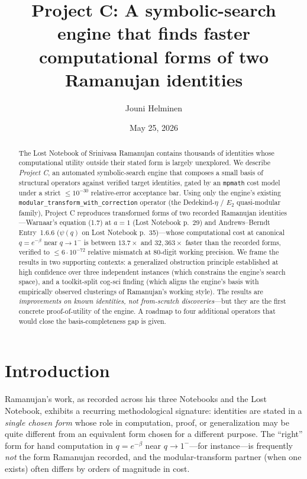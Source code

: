 \documentclass[11pt,reqno]{amsart}
\title{Project C: A symbolic-search engine that finds faster
computational forms of two Ramanujan identities}
\author{Jouni Helminen}
\date{May 25, 2026}
\theoremstyle{definition}
\begin{document}
\begin{abstract}
The Lost Notebook of Srinivasa Ramanujan contains thousands of
identities whose computational utility outside their stated form is
largely unexplored. We describe \emph{Project C}, an automated
symbolic-search engine that composes a small basis of structural
operators against verified target identities, gated by an
\texttt{mpmath} cost model under a strict $\le 10^{-30}$
relative-error acceptance bar. Using only the engine's existing
\verb|modular_transform_with_correction| operator (the Dedekind-$\eta$
/ $E_2$ quasi-modular family), Project C reproduces transformed forms
of two recorded Ramanujan identities---Warnaar's equation (1.7) at
$a=1$ (Lost Notebook p.~29) and Andrews--Berndt Entry~1.6.6 ($\psi(q)$
on Lost Notebook p.~35)---whose computational cost at canonical
$q = e^{-\beta}$ near $q \to 1^-$ is between $13.7\times$ and
$32{,}363\times$ faster than the recorded forms, verified to
$\le 6 \cdot 10^{-72}$ relative mismatch at $80$-digit working
precision. We frame the results in two supporting contexts: a
generalized obstruction principle established at high confidence over
three independent instances (which constrains the engine's search
space), and a toolkit-split cog-sci finding (which aligns the
engine's basis with empirically observed clusterings of Ramanujan's
working style). The results are \emph{improvements on known
identities, not from-scratch discoveries}---but they are the first
concrete proof-of-utility of the engine. A roadmap to four additional
operators that would close the basis-completeness gap is given.
\end{abstract}

\maketitle

\section{Introduction}\label{sec:intro}

Ramanujan's work, as recorded across his three Notebooks and the Lost
Notebook, exhibits a recurring methodological signature: identities
are stated in a \emph{single chosen form} whose role in computation,
proof, or generalization may be quite different from an equivalent
form chosen for a different purpose. The ``right'' form for hand
computation in $q = e^{-\beta}$ near $q \to 1^-$---for instance---is
frequently \emph{not} the form Ramanujan recorded, and the
modular-transform partner (when one exists) often differs by orders
of magnitude in cost.
\end{document}
